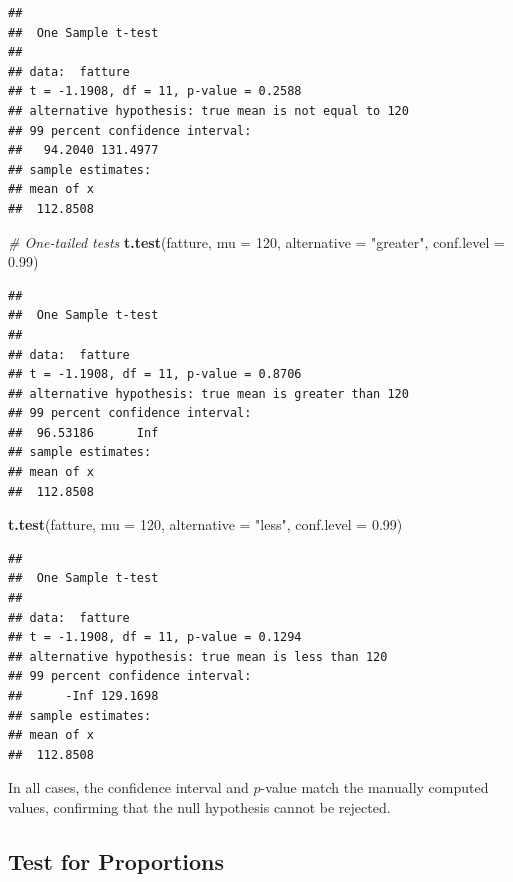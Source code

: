 \documentclass[
]{article}
\newenvironment{Shaded}{\begin{snugshade}}{\end{snugshade}}
\newcommand{\AttributeTok}[1]{\textcolor[rgb]{0.13,0.29,0.53}{#1}}
\newcommand{\CommentTok}[1]{\textcolor[rgb]{0.56,0.35,0.01}{\textit{#1}}}
\newcommand{\DecValTok}[1]{\textcolor[rgb]{0.00,0.00,0.81}{#1}}
\newcommand{\FloatTok}[1]{\textcolor[rgb]{0.00,0.00,0.81}{#1}}
\newcommand{\FunctionTok}[1]{\textcolor[rgb]{0.13,0.29,0.53}{\textbf{#1}}}
\newcommand{\NormalTok}[1]{#1}
\newcommand{\StringTok}[1]{\textcolor[rgb]{0.31,0.60,0.02}{#1}}
\begin{document}
\begin{verbatim}
## 
##  One Sample t-test
## 
## data:  fatture
## t = -1.1908, df = 11, p-value = 0.2588
## alternative hypothesis: true mean is not equal to 120
## 99 percent confidence interval:
##   94.2040 131.4977
## sample estimates:
## mean of x 
##  112.8508
\end{verbatim}

\begin{Shaded}
\begin{Highlighting}[]
\CommentTok{\# One{-}tailed tests}
\FunctionTok{t.test}\NormalTok{(fatture, }\AttributeTok{mu =} \DecValTok{120}\NormalTok{, }\AttributeTok{alternative =} \StringTok{"greater"}\NormalTok{, }\AttributeTok{conf.level =} \FloatTok{0.99}\NormalTok{)}
\end{Highlighting}
\end{Shaded}

\begin{verbatim}
## 
##  One Sample t-test
## 
## data:  fatture
## t = -1.1908, df = 11, p-value = 0.8706
## alternative hypothesis: true mean is greater than 120
## 99 percent confidence interval:
##  96.53186      Inf
## sample estimates:
## mean of x 
##  112.8508
\end{verbatim}

\begin{Shaded}
\begin{Highlighting}[]
\FunctionTok{t.test}\NormalTok{(fatture, }\AttributeTok{mu =} \DecValTok{120}\NormalTok{, }\AttributeTok{alternative =} \StringTok{"less"}\NormalTok{, }\AttributeTok{conf.level =} \FloatTok{0.99}\NormalTok{)}
\end{Highlighting}
\end{Shaded}

\begin{verbatim}
## 
##  One Sample t-test
## 
## data:  fatture
## t = -1.1908, df = 11, p-value = 0.1294
## alternative hypothesis: true mean is less than 120
## 99 percent confidence interval:
##      -Inf 129.1698
## sample estimates:
## mean of x 
##  112.8508
\end{verbatim}

In all cases, the confidence interval and \(p\)-value match the manually
computed values, confirming that the null hypothesis cannot be rejected.

\hypertarget{test-for-proportions}{%
\subsection{Test for Proportions}\label{test-for-proportions}}
\end{document}
